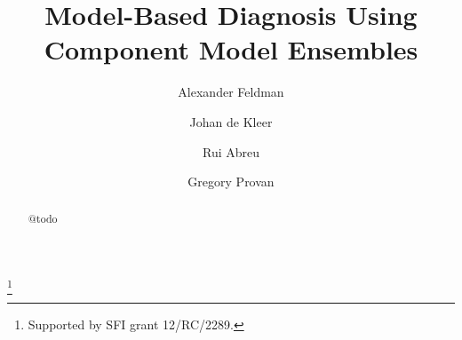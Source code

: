 \documentclass{ifacconf}
\begin{document}
%
\begin{frontmatter}
%
\title{Model-Based Diagnosis Using Component Model Ensembles}
%
\thanks[footnoteinfo]{Supported by SFI grant 12/RC/2289.}
%
\author[First]{Alexander Feldman}
\author[First]{Johan de Kleer}
\author[First]{Rui Abreu}
\author[Second]{Gregory Provan}
%
\address[First]{PARC Inc., Palo Alto, CA 94304, USA\\(e-mail: \{afeldman,dekleer,rui\}@parc.com)}
\address[Second]{Department of Computer Science, University College Cork, Cork, Ireland (e-mail: g.provan@cs.ucc.ie).}
%
\begin{abstract}
@todo
\end{abstract}
\end{frontmatter}
%






%

%
\end{document}
